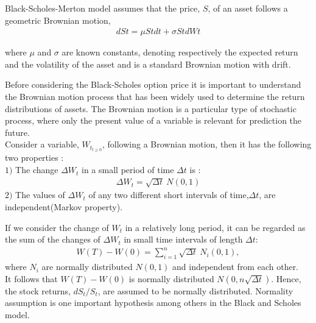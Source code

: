 \documentclass[12pt]{report}
\begin{document}
Black-Scholes-Merton model assumes that the price, $S$, of an asset follows a geometric Brownian motion,
\begin{gather}
dSt = \mu Stdt +\sigma StdWt
\end{gather}

where $\mu$ and $\sigma$ are known constants, 
denoting respectively the expected return and the volatility of the asset and  is a standard Brownian motion with drift.\\


Before considering the Black-Scholes option price it is  important to understand the Brownian motion process that has been widely used to determine the return distributions
of assets. The Brownian motion is a particular type of  stochastic process, where only the present value of a variable is  relevant for prediction the future.\\
Consider a variable, $W_{t_{t \geqslant 0}}$,  following a Brownian motion, then it has the following two properties :\\

$1)$ The change $\Delta W_t$ in a small  period of time $\Delta t$ is : 
\begin{gather}
\Delta W_t= \sqrt{\Delta t}~ N(0,1)
\end{gather}
$2)$ The values of $\Delta W_t$ of any two different short intervals of time,$\Delta t$, are independent(Markov property).
 
If we consider the change of $W_t$ in a relatively long period, it can be regarded as the sum of the changes of $\Delta W_t$ in small time intervals of length $\Delta t$:
 \begin{gather}
W(T)-W(0)= \sum\limits_{i=1}^n \sqrt{\Delta t}~ N_i(0,1)  ,  
 \end{gather}
where $N_i$ are normally distributed  $N(0,1)$ and  independent from each other.\\
  It follows that $W(T)-W(0)$ is normally distributed $N(0,n\sqrt{\Delta t})$. Hence, the stock returns, $dS_t/S_t$, are assumed to be normally distributed. Normality assumption is one important hypothesis among others in the Black and Scholes model.\\
\end{document}

